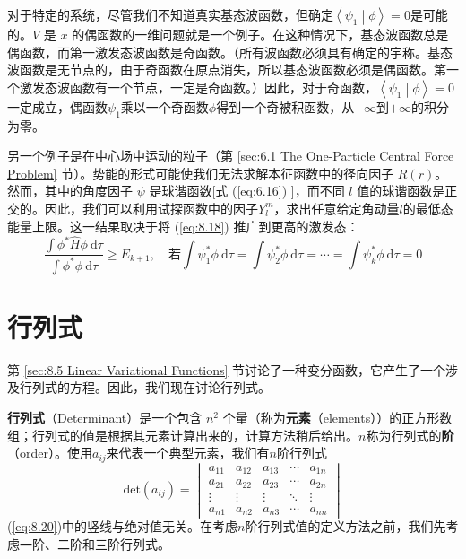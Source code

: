     对于特定的系统，尽管我们不知道真实基态波函数，但确定$\left\langle \psi_1 \middle| \phi \right\rangle = 0$是可能的。$V$ 是 $x$ 的偶函数的一维问题就是一个例子。在这种情况下，基态波函数总是偶函数，而第一激发态波函数是奇函数。（所有波函数必须具有确定的宇称。基态波函数是无节点的，由于奇函数在原点消失，所以基态波函数必须是偶函数。第一个激发态波函数有一个节点，一定是奇函数。）因此，对于奇函数，$\left\langle \psi_1 \middle| \phi \right\rangle = 0$一定成立，偶函数$\psi_1$乘以一个奇函数$\phi$得到一个奇被积函数，从$-\infty$到$+\infty$的积分为零。

    另一个例子是在中心场中运动的粒子（第 \ref{sec:6.1 The One-Particle Central Force Problem} 节）。势能的形式可能使我们无法求解本征函数中的径向因子 $R(r)$。然而，其中的角度因子 $\psi$ 是球谐函数[式 (\ref{eq:6.16}) ]，而不同 $l$ 值的球谐函数是正交的。因此，我们可以利用试探函数中的因子$Y_l^m$，求出任意给定角动量$l$的最低态能量上限。这一结果取决于将 (\ref{eq:8.18}) 推广到更高的激发态：
    \begin{equation}
        \frac{\int \phi^{\ast} \hat{H}\phi \:\mathrm{d}\tau}{\int \phi^{\ast} \phi \:\mathrm{d}\tau} \geq E_{k+1}, \quad \text{若} \int \psi_1^{\ast} \phi \: \mathrm{d}\tau = \int \psi_2^{\ast} \phi \:\mathrm{d}\tau = \cdots = \int \psi_k^{\ast} \phi \:\mathrm{d}\tau = 0
        \label{eq:8.19}
    \end{equation}

\section{行列式}
\label{sec:8.3 Determinants}
    第 \ref{sec:8.5 Linear Variational Functions} 节讨论了一种变分函数，它产生了一个涉及行列式的方程。因此，我们现在讨论行列式。
     
    \textbf{行列式}（Determinant）是一个包含 $n^2$ 个量（称为\textbf{元素}（elements））的正方形数组；行列式的值是根据其元素计算出来的，计算方法稍后给出。$n$称为行列式的\textbf{阶}（order）。使用$a_{ij}$来代表一个典型元素，我们有$n$阶行列式
    \begin{equation}
            \mathrm{det}\left(a_{ij}\right) = \begin{vmatrix}
                a_{11} & a_{12} & a_{13} & \cdots & a_{1n} \\
                a_{21} & a_{22} & a_{23} & \cdots & a_{2n} \\
                \vdots & \vdots & \vdots & \ddots & \vdots \\
                a_{n1} & a_{n2} & a_{n3} & \cdots & a_{nn}
            \end{vmatrix}
            \label{eq:8.20}
    \end{equation}
    (\ref{eq:8.20})中的竖线与绝对值无关。在考虑$n$阶行列式值的定义方法之前，我们先考虑一阶、二阶和三阶行列式。

